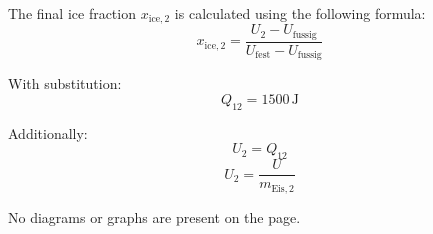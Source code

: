 The final ice fraction \( x_{\text{ice},2} \) is calculated using the following formula:  
\[
x_{\text{ice},2} = \frac{U_2 - U_{\text{fussig}}}{U_{\text{fest}} - U_{\text{fussig}}}
\]  

With substitution:  
\[
Q_{12} = 1500 \, \text{J}
\]  

Additionally:  
\[
U_2 = Q_{12}
\]  
\[
U_2 = \frac{U}{m_{\text{Eis},2}}
\]  

No diagrams or graphs are present on the page.